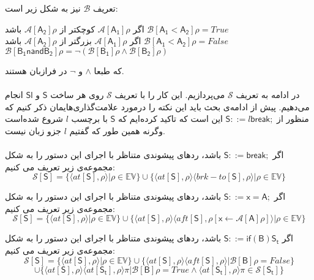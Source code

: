تعریف  $\mathcal{B}$ نیز به شکل زیر است:
\begin{center}
	اگر $\mathcal{A[\mathsf{A_1}]\rho }$ کوچکتر از $\mathcal{A[\mathsf{A_2}]\rho }$ باشد
	$\mathcal{B[\mathsf{A_1<A_2}]\rho = } True   \hspace{2cm}  $\\
	اگر $\mathcal{A[\mathsf{A_1}]\rho }$ بزرگتر از $\mathcal{A[\mathsf{A_2}]\rho }$ باشد
	$\mathcal{B[\mathsf{A_1<A_2}]\rho = } False   \hspace{2cm}  $\\
	$ \mathcal{B[\mathsf{B_1 nand B_2}]\rho = } \neg(\mathcal{B[\mathsf{B_1}]\rho}   \wedge \mathcal{B[\mathsf{B_2}]\rho}) $
\end{center}

که طبعا $\wedge$ و $\neg$ در فرازبان هستند.\\\\
در ادامه به تعریف $\mathcal{S}$ می‌پردازیم. این کار را با تعریف $\mathcal{S}$ روی هر ساخت $\mathsf{S}$ و $\mathsf{Sl}$ انجام می‌دهیم.
پیش از ادامه‌ی بحث باید این نکته را در‌مورد علامت‌گذاری‌هایمان ذکر کنیم که منظور از $        \mathsf{S} ::= l \mathsf{break;}  $ این است که تاکید کرده‌ایم که $\mathsf{S}$ با برچسب $l$ شروع شده‌است وگرنه همین طور که گفتیم   $l$ جزو زبان نیست.\\\\
اگر $        \mathsf{S} ::= \mathsf{break;}  $ باشد، ردهای پیشوندی متناظر با اجرای این دستور را به شکل مجموعه‌ی زیر تعریف می کنیم:
$$\mathcal{S} [\mathsf{S}] = \{ \langle at[\mathsf{S}] , \rho \rangle | \rho \in \mathbb{EV}       \} \cup     \{ \langle at[\mathsf{S}] , \rho \rangle \langle brk-to[\mathsf{S}] , \rho \rangle | \rho \in \mathbb{EV}       \}             $$   


اگر $        \mathsf{S} ::=  \mathsf{x=A;}  $ باشد، ردهای پیشوندی متناظر با اجرای این دستور را به شکل مجموعه‌ی زیر تعریف می کنیم:
$$\mathcal{S} [\mathsf{S}] = \{ \langle at[\mathsf{S}] , \rho \rangle | \rho \in \mathbb{EV}       \} \cup     \{ \langle at[\mathsf{S}] , \rho \rangle \langle aft[\mathsf{S}] , \rho[\mathsf{x}\leftarrow \mathcal{A}[\mathsf{A}]\rho] \rangle | \rho \in \mathbb{EV}       \}             $$   

اگر $         \mathsf{S} ::= \mathsf{if}  \mathsf{ (B) S_t}  $ باشد، ردهای پیشوندی متناظر با اجرای این دستور را به شکل مجموعه‌ی زیر تعریف می کنیم:
$$\mathcal{S} [\mathsf{S}] = \{ \langle at[\mathsf{S}] , \rho \rangle | \rho \in \mathbb{EV}       \} \cup     \{ \langle at[\mathsf{S}] , \rho \rangle \langle aft[\mathsf{S}] , \rho \rangle | \mathcal{B}[\mathsf{B}] \rho =False      \} 
$$$$\cup    \{ \langle at[\mathsf{S}] , \rho \rangle \langle at[\mathsf{S_t}] , \rho \rangle 
\pi | \mathcal{B}[\mathsf{B}] \rho =True  \wedge   \langle  at[\mathsf{S_t}]  , \rho \rangle \pi \in \mathcal{S} [\mathsf{S_t}]    \}          $$ 


